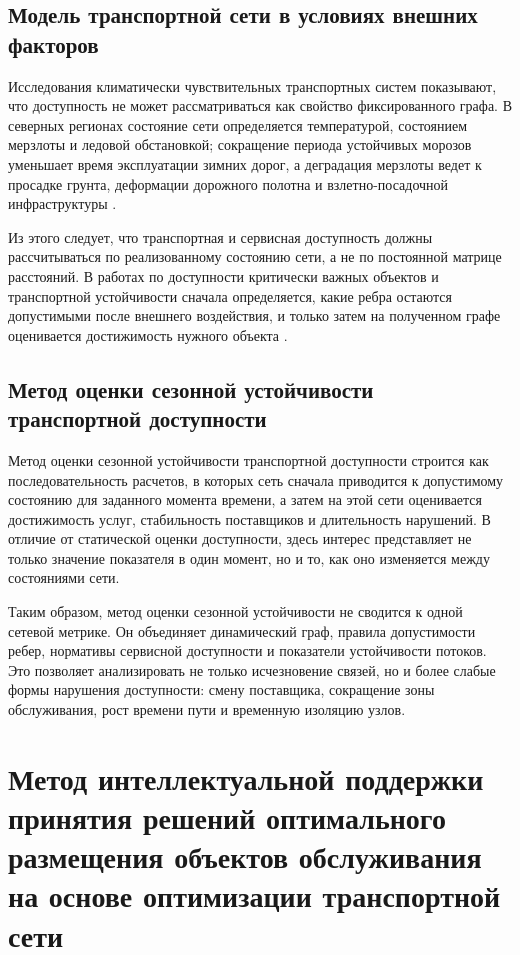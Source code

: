 \documentclass[14pt,a4paper]{extarticle}
\begin{document}
\subsection*{Модель транспортной сети в условиях внешних факторов}

Исследования климатически чувствительных транспортных систем показывают, что доступность не может рассматриваться как свойство фиксированного графа. В северных регионах состояние сети определяется температурой, состоянием мерзлоты и ледовой обстановкой; сокращение периода устойчивых морозов уменьшает время эксплуатации зимних дорог, а деградация мерзлоты ведет к просадке грунта, деформации дорожного полотна и взлетно-посадочной инфраструктуры \cite{dong2025iceRoads,waite2023arcticTransport,stephenson2011arcticAccess,povoroznyuk2022arcticRoads}.

Из этого следует, что транспортная и сервисная доступность должны рассчитываться по реализованному состоянию сети, а не по постоянной матрице расстояний. В работах по доступности критически важных объектов и транспортной устойчивости сначала определяется, какие ребра остаются допустимыми после внешнего воздействия, и только затем на полученном графе оценивается достижимость нужного объекта \cite{gangwal2023criticalFacility,yin2023transportResilience}.

\subsection*{Метод оценки сезонной устойчивости транспортной доступности}

Метод оценки сезонной устойчивости транспортной доступности строится как последовательность расчетов, в которых сеть сначала приводится к допустимому состоянию для заданного момента времени, а затем на этой сети оценивается достижимость услуг, стабильность поставщиков и длительность нарушений. В отличие от статической оценки доступности, здесь интерес представляет не только значение показателя в один момент, но и то, как оно изменяется между состояниями сети.

Таким образом, метод оценки сезонной устойчивости не сводится к одной сетевой метрике. Он объединяет динамический граф, правила допустимости ребер, нормативы сервисной доступности и показатели устойчивости потоков. Это позволяет анализировать не только исчезновение связей, но и более слабые формы нарушения доступности: смену поставщика, сокращение зоны обслуживания, рост времени пути и временную изоляцию узлов.

\section*{Метод интеллектуальной поддержки принятия решений оптимального размещения объектов обслуживания на основе оптимизации транспортной сети}
\end{document}
